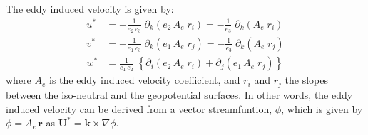 \documentclass[../main/NEMO_manual]{subfiles}
\begin{document}
The eddy induced velocity is given by:
\begin{equation}
  \label{eq:ALGOS_eiv_v}
  \begin{split}
    u^* & = - \frac{1}{e_2\,e_{3}}          \;\partial_k \left( e_2 \, A_e \; r_i  \right)
    = - \frac{1}{e_3}                     \;\partial_k \left(           A_e \; r_i  \right)            \\
    v^* & = - \frac{1}{e_1\,e_3}\;             \partial_k \left( e_1 \, A_e \; r_j  \right)
    = - \frac{1}{e_3}                     \;\partial_k \left(           A_e \; r_j  \right)             \\
    w^* & =    \frac{1}{e_1\,e_2}\; \left\{   \partial_i  \left( e_2 \, A_e \; r_i  \right)
      + \partial_j  \left( e_1 \, A_e \;r_j   \right) \right\}
  \end{split}
\end{equation}
where $A_{e}$ is the eddy induced velocity coefficient,
and $r_i$ and $r_j$ the slopes between the iso-neutral and the geopotential surfaces.
In other words, the eddy induced velocity can be derived from a vector streamfuntion, $\phi$,
which is given by $\phi = A_e\,\textbf{r}$ as $\textbf{U}^*  = \textbf{k} \times \nabla \phi$.
\end{document}
